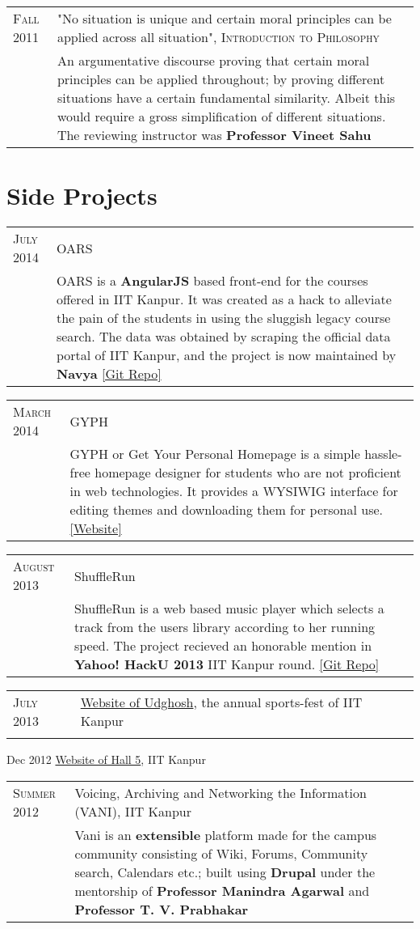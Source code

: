 \documentclass[a4paper,10pt]{article} %
\newcommand{\project}[3]{
    \begin{tabular}{>{\raggedleft}p{2.2cm}|p{16.5cm}}
        \textsc{#1} & #2 \\
                    & \footnotesize{#3} \\
    \end{tabular}
}
\begin{document}
\project {Fall 2011}
         {"No situation is unique and certain moral principles can be applied across all situation",
          \textsc{Introduction to Philosophy}}
         {An argumentative discourse proving that certain moral principles
          can be applied throughout; by proving different situations have a certain
          fundamental similarity.  Albeit this would require a gross simplification of
          different situations.  The reviewing instructor was \textbf{Professor Vineet Sahu}}

\section{Side Projects}

\project {July 2014}
         {OARS}
         {OARS is a \textbf{AngularJS} based front-end for the
          courses offered in IIT Kanpur. It was created as a
          hack to alleviate the pain of the students in using the
          sluggish legacy course search. The data was obtained by
          scraping the official data portal of IIT Kanpur, and the
          project is now maintained by \textbf{Navya}
          \href{https://github.com/navya/oars} {[Git Repo]} }

\project {March 2014}
         {GYPH}
         {GYPH or Get Your Personal Homepage
          is a simple hassle-free homepage designer for students who are not
          proficient in web technologies. It provides a WYSIWIG
          interface for editing themes and downloading them for personal use.
          \href{http://gyph2.herokuapp.com/} {[Website]} }

\project {August 2013}
         {ShuffleRun}
         {ShuffleRun is a web based music player which selects a track from the
          users library according to her running speed.
          The project recieved an honorable mention in \textbf{Yahoo!  HackU 2013} IIT Kanpur round.
          \href{https://github.com/srijanshetty/ShuffleRun} {[Git Repo]}}

\project {July 2013}
         {\href{www.udghosh.org}{Website of Udghosh}, the annual sports-fest of IIT Kanpur}

\project {Dec 2012}
         {\href{http://www.iitk.ac.in/hall5}{Website of Hall 5}, IIT Kanpur }

\project {Summer 2012}
         {Voicing, Archiving and Networking the Information \textsc{(VANI)}, IIT Kanpur}
         {Vani is an \textbf{extensible} platform
          made for the campus community consisting of Wiki, Forums,
          Community search, Calendars etc.; built using \textbf{Drupal}
          under the mentorship of \textbf{Professor Manindra Agarwal} and
          \textbf{Professor T. V. Prabhakar} }
\end{document}
